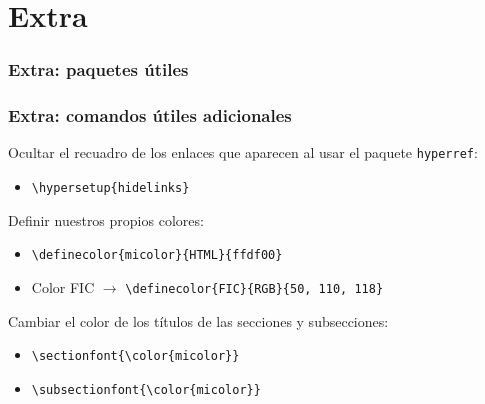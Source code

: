 \section{Extra}
\begin{frame}[fragile]
\frametitle{Extra: paquetes útiles}


\end{frame}


\begin{frame}[fragile]
\frametitle{Extra: comandos útiles adicionales}

Ocultar el recuadro de los enlaces que aparecen al usar el paquete \verb|hyperref|:
\begin{itemize}
    \item \verb|\hypersetup{hidelinks}|
\end{itemize}

\vspace{0.5cm}

Definir nuestros propios colores:
\begin{itemize}
    \item \verb|\definecolor{micolor}{HTML}{ffdf00}|
    \item Color FIC $\rightarrow$ \verb|\definecolor{FIC}{RGB}{50, 110, 118}|
\end{itemize}

\vspace{0.5cm} 

Cambiar el color de los títulos de las secciones y subsecciones:
\begin{itemize}
    \item \verb|\sectionfont{\color{micolor}}|
    \item \verb|\subsectionfont{\color{micolor}}|
\end{itemize}

\end{frame}

